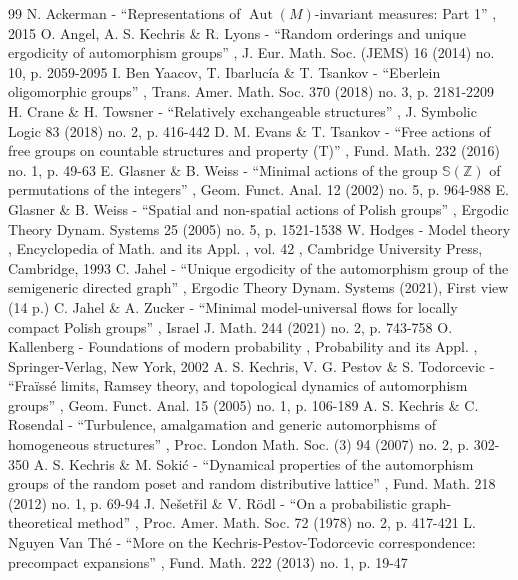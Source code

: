 \documentclass[11pt]{article}
\theoremstyle{plain}
\theoremstyle{definition}
\begin{document}
\begin{thebibliography}{99}
 N. Ackerman - “Representations of $\operatorname{Aut}({M})$-invariant measures: Part 1” , 2015
 O. Angel, A. S. Kechris \& R. Lyons - “Random orderings and unique ergodicity of automorphism groups” , J. Eur. Math. Soc. (JEMS) 16 (2014) no. 10, p. 2059-2095
 I. Ben Yaacov, T. Ibarlucía \& T. Tsankov - “Eberlein oligomorphic groups” , Trans. Amer. Math. Soc. 370 (2018) no. 3, p. 2181-2209
 H. Crane \& H. Towsner - “Relatively exchangeable structures” , J. Symbolic Logic 83 (2018) no. 2, p. 416-442
 D. M. Evans \& T. Tsankov - “Free actions of free groups on countable structures and property (T)” , Fund. Math. 232 (2016) no. 1, p. 49-63
 E. Glasner \& B. Weiss - “Minimal actions of the group $\mathbb{S}(\mathbb{Z})$ of permutations of the integers” , Geom. Funct. Anal. 12 (2002) no. 5, p. 964-988
 E. Glasner \& B. Weiss - “Spatial and non-spatial actions of Polish groups” , Ergodic Theory Dynam. Systems 25 (2005) no. 5, p. 1521-1538
 W. Hodges - Model theory , Encyclopedia of Math. and its Appl. , vol. 42 , Cambridge University Press, Cambridge, 1993
 C. Jahel - “Unique ergodicity of the automorphism group of the semigeneric directed graph” , Ergodic Theory Dynam. Systems (2021), First view (14 p.)
 C. Jahel \& A. Zucker - “Minimal model-universal flows for locally compact Polish groups” , Israel J. Math. 244 (2021) no. 2, p. 743-758
 O. Kallenberg - Foundations of modern probability , Probability and its Appl. , Springer-Verlag, New York, 2002
 A. S. Kechris, V. G. Pestov \& S. Todorcevic - “Fraïssé limits, Ramsey theory, and topological dynamics of automorphism groups” , Geom. Funct. Anal. 15 (2005) no. 1, p. 106-189
 A. S. Kechris \& C. Rosendal - “Turbulence, amalgamation and generic automorphisms of homogeneous structures” , Proc. London Math. Soc. (3) 94 (2007) no. 2, p. 302-350
 A. S. Kechris \& M. Sokić - “Dynamical properties of the automorphism groups of the random poset and random distributive lattice” , Fund. Math. 218 (2012) no. 1, p. 69-94
 J. Nešetřil \& V. Rödl - “On a probabilistic graph-theoretical method” , Proc. Amer. Math. Soc. 72 (1978) no. 2, p. 417-421
 L. Nguyen Van Thé - “More on the Kechris-Pestov-Todorcevic correspondence: precompact expansions” , Fund. Math. 222 (2013) no. 1, p. 19-47

\end{thebibliography}
\end{document}
